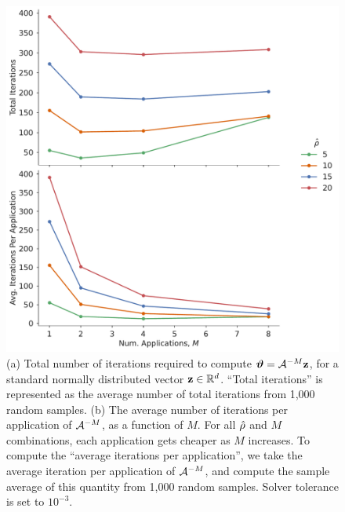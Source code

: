\begin{figure}
    \centering
    \includegraphics[width=.7\textwidth]{../figures/iterations_vs_applications.pdf}
    \caption{(a) Total number of iterations required to compute
        $\bm{\vartheta} = \mathcal{A}^{-M}\mathbf{z}$, for a standard normally distributed
        vector $\mathbf{z}\in\mathbb{R}^{d}$.
        ``Total iterations'' is represented as the average number of total
        iterations from 1,000 random samples.
        (b) The average number of iterations per application of
        $\mathcal{A}^{-M}$, as a function of $M$.
        For all $\hat{\rho}$ and $M$ combinations, each application gets cheaper as
        $M$ increases.
        To compute the ``average iterations per application'', we take the
        average iteration per application of $\mathcal{A}^{-M}$, and compute the sample
        average of this quantity from 1,000 random samples.
        Solver tolerance is set to $10^{-3}$.
    }
    \label{fig:iters_and_apps}
\end{figure}
